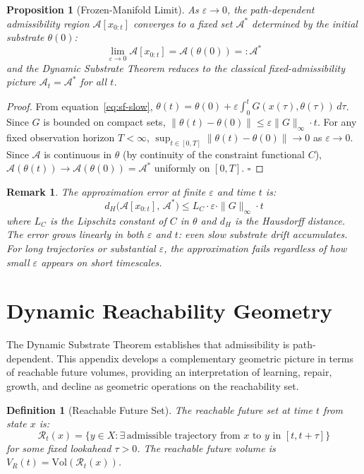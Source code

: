 \documentclass[12pt,a4paper]{article}
\newtheorem{proposition}[theorem]{Proposition}
\newtheorem{definition}[theorem]{Definition}
\newtheorem{remark}[theorem]{Remark}
\begin{document}
\begin{proposition}[Frozen-Manifold Limit]
\label{prop:frozen-limit}
As $\varepsilon \to 0$, the path-dependent admissibility region $\mathcal{A}[x_{0:t}]$ converges to a fixed set $\mathcal{A}^*$ determined by the initial substrate $\theta(0)$:
\[
\lim_{\varepsilon \to 0} \mathcal{A}[x_{0:t}] = \mathcal{A}(\theta(0)) =: \mathcal{A}^*
\]
and the Dynamic Substrate Theorem reduces to the classical fixed-admissibility picture $\mathcal{A}_t = \mathcal{A}^*$ for all $t$.
\end{proposition}

\begin{proof}
From equation~\eqref{eq:sf-slow}, $\theta(t) = \theta(0) + \varepsilon \int_0^t G(x(\tau), \theta(\tau))\,d\tau$. Since $G$ is bounded on compact sets, $\|\theta(t) - \theta(0)\| \leq \varepsilon \|G\|_\infty \cdot t$. For any fixed observation horizon $T < \infty$, $\sup_{t \in [0,T]} \|\theta(t) - \theta(0)\| \to 0$ as $\varepsilon \to 0$. Since $\mathcal{A}$ is continuous in $\theta$ (by continuity of the constraint functional $C$), $\mathcal{A}(\theta(t)) \to \mathcal{A}(\theta(0)) = \mathcal{A}^*$ uniformly on $[0,T]$. $\square$
\end{proof}

\begin{remark}
The approximation error at finite $\varepsilon$ and time $t$ is:
\[
d_H\!\bigl(\mathcal{A}[x_{0:t}],\, \mathcal{A}^*\bigr) \leq L_C \cdot \varepsilon \cdot \|G\|_\infty \cdot t
\]
where $L_C$ is the Lipschitz constant of $C$ in $\theta$ and $d_H$ is the Hausdorff distance. The error grows linearly in both $\varepsilon$ and $t$: even slow substrate drift accumulates. For long trajectories or substantial $\varepsilon$, the approximation fails regardless of how small $\varepsilon$ appears on short timescales.
\end{remark}

\section{Dynamic Reachability Geometry}
\label{app:reachability}

The Dynamic Substrate Theorem establishes that admissibility is path-dependent. This appendix develops a complementary geometric picture in terms of reachable future volumes, providing an interpretation of learning, repair, growth, and decline as geometric operations on the reachability set.

\begin{definition}[Reachable Future Set]
The reachable future set at time $t$ from state $x$ is:
\[
\mathcal{R}_t(x) = \bigl\{ y \in X : \exists\, \text{admissible trajectory from } x \text{ to } y \text{ in } [t, t+\tau] \bigr\}
\]
for some fixed lookahead $\tau > 0$. The reachable future volume is $V_R(t) = \mathrm{Vol}(\mathcal{R}_t(x))$.
\end{definition}
\end{document}
